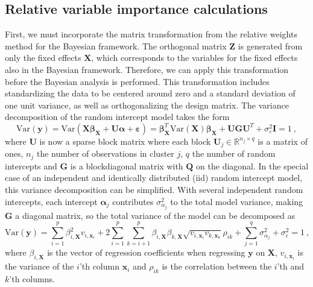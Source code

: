 \subsection{Relative variable importance calculations}
First, we must incorporate the matrix transformation from the relative weights method for the Bayesian framework.
The orthogonal matrix $\mathbf{Z}$ is generated from only the fixed effects $\mathbf{X}$, which corresponds to the variables for the fixed effects also in the Bayesian framework. Therefore, we can apply this transformation before the Bayesian analysis is performed.
This transformation includes standardizing the data to be centered around zero and a standard deviation of one unit variance, as well as orthogonalizing the design matrix.
\newline
\newline
The variance decomposition of the random intercept model takes the form
\begin{equation}
    \text{Var}(\mathbf{y}) = \text{Var}(\mathbf{X}\boldsymbol{\beta}_{\mathbf{X}} + \mathbf{U}\boldsymbol{\alpha} + \boldsymbol{\varepsilon}) = \boldsymbol{\beta}_{\mathbf{X}}^T\text{Var}(\mathbf{X})\boldsymbol{\beta}_{\mathbf{X}} + \mathbf{U}\mathbf{G}\mathbf{U}^T + \sigma_{\varepsilon}^2\mathbf{I} = 1  \ ,
    \label{eqn:Variance_random}
\end{equation}
where $\mathbf{U}$ is now a sparse block matrix where each block $\mathbf{U}_j \in \mathbb{R}^{n_j \times q}$ is a matrix of ones, $n_j$ the number of observations in cluster $j$, $q$ the number of random intercepts and $\mathbf{G}$ is a blockdiagonal matrix with $\mathbf{Q}$ on the diagonal.
In the special case of an independent and identically distributed (iid) random intercept model, this variance decomposition can be simplified.
With several independent random intercepts, each intercept $\boldsymbol{\alpha}_j$ contributes $\sigma^2_{\alpha_j}$ to the total model variance, making $\mathbf{G}$ a diagonal matrix, so the total variance of the model can be decomposed as
\begin{equation}\label{eq:variance_theoretical_x}
    \text{Var}(\mathbf{y}) = \sum_{i=1}^p \beta_{i, \mathbf{X}}^2 v_{i, \mathbf{x}_i} + 2 \sum_{i=1}^p \sum_{k=i+1}^p \beta_{i, \mathbf{X}}\beta_{k, \mathbf{X}}\sqrt{v_{i, \mathbf{x}_i}v_{k, \mathbf{x}_k}}\rho_{ik} + \sum_{j=1}^q \sigma^2_{\alpha_j} + \sigma^2_{\epsilon} = 1 \ ,
\end{equation}
where $\beta_{i, \mathbf{X}}$ is the vector of regression coefficients when regressing $\mathbf{y}$ on $\mathbf{X}$, $v_{i, \mathbf{x}_i}$ is the variance of the $i$'th column $\mathbf{x}_i$ and $\rho_{ik}$ is the correlation between the $i$'th and $k$'th columns. 
